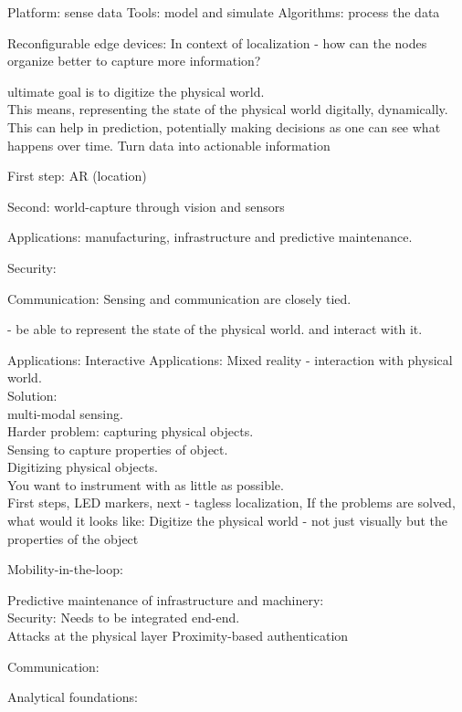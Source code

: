 \documentclass[10pt]{article}
\begin{document}
Platform: sense data
Tools: model and simulate
Algorithms: process the data

Reconfigurable edge devices:
In context of localization - how can the nodes organize better to capture more information?


ultimate goal is to digitize the physical world.\\
This means, representing the state of the physical world digitally, dynamically. This can help in prediction, potentially making decisions as one can see what happens over time.
Turn data into actionable information


First step: AR (location)

Second: world-capture through vision and sensors

Applications: manufacturing, infrastructure and predictive maintenance.

Security:

Communication: Sensing and communication are closely tied.



 - be able to represent the state of the physical world. and interact with it.

Applications:
Interactive Applications: Mixed reality - interaction with physical world.\\
Solution:\\
multi-modal sensing.\\
Harder problem: capturing physical objects. \\
Sensing to capture properties of object.\\
Digitizing physical objects.\\
You want to instrument with as little as possible.\\
First steps, LED markers, next - tagless localization, 
If the problems are solved, what would it looks like: Digitize the physical world - not just visually but the properties of the object

Mobility-in-the-loop:

Predictive maintenance of infrastructure and machinery:\\

Security:
Needs to be integrated end-end.\\
Attacks at the physical layer 
Proximity-based authentication

Communication:



Analytical foundations:\\
\end{document}
